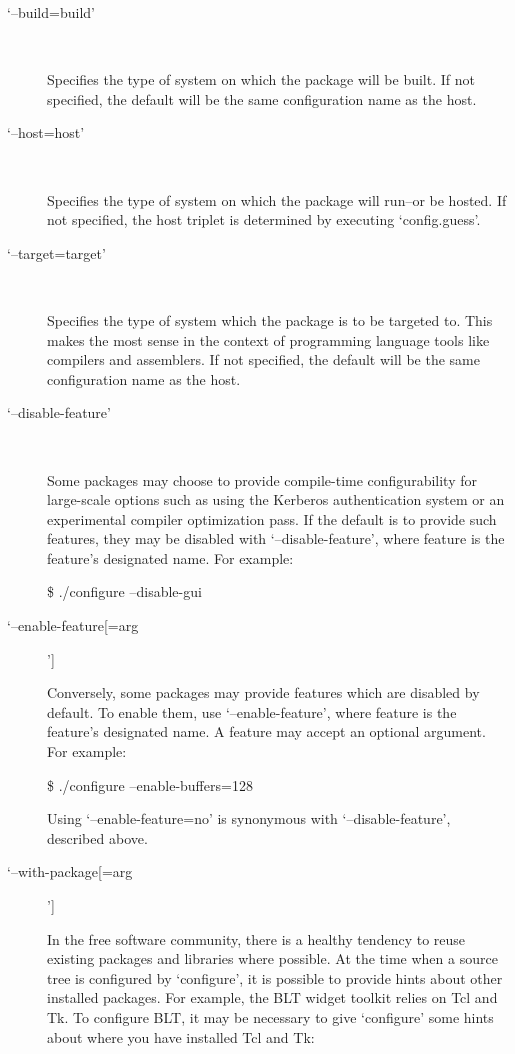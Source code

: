 \begin{description}
\item[`--build=build']
\ %

Specifies the type of system on which the package will be built. If not specified, the default will be the same configuration name as the host. 

\item[`--host=host']
\ %

Specifies the type of system on which the package will run--or be hosted. If not specified, the host triplet is determined by executing `config.guess'. 

\item[`--target=target']
\ %

Specifies the type of system which the package is to be targeted to. This makes the most sense in the context of programming language tools like compilers and assemblers. If not specified, the default will be the same configuration name as the host. 

\item[`--disable-feature']
\ %

Some packages may choose to provide compile-time configurability for large-scale options such as using the Kerberos authentication system or an experimental compiler optimization pass. If the default is to provide such features, they may be disabled with `--disable-feature', where feature is the feature's designated name. For example: 


 
\$ ./configure --disable-gui



\item[`--enable-feature[=arg]']
\ %

Conversely, some packages may provide features which are disabled by default. To enable them, use `--enable-feature', where feature is the feature's designated name. A feature may accept an optional argument. For example: 


 
        \$ ./configure --enable-buffers=128



 Using `--enable-feature=no' is synonymous with `--disable-feature', described above. 


\item[`--with-package[=arg]']
\ %

In the free software community, there is a healthy tendency to reuse existing packages and libraries where possible. At the time when a source tree is configured by `configure', it is possible to provide hints about other installed packages. For example, the BLT widget toolkit relies on Tcl and Tk. To configure BLT, it may be necessary to give `configure' some hints about where you have installed Tcl and Tk: 



\end{description}
